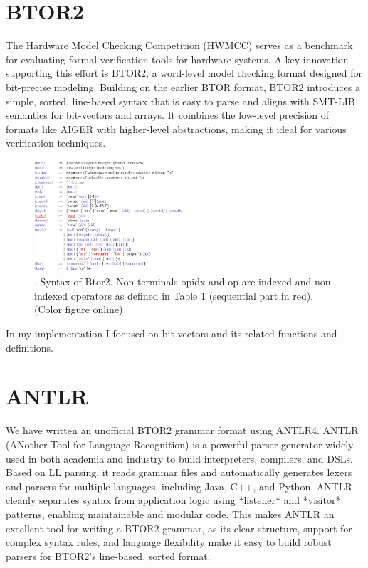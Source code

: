\section{BTOR2}
The Hardware Model Checking Competition (HWMCC) serves as a benchmark for evaluating formal verification tools for hardware systems. A key innovation supporting this effort is BTOR2, a word-level model checking format designed for bit-precise modeling. Building on the earlier BTOR format, BTOR2 introduces a simple, sorted, line-based syntax that is easy to parse and aligns with SMT-LIB semantics for bit-vectors and arrays. It combines the low-level precision of formats like AIGER with higher-level abstractions, making it ideal for various verification techniques. 
\begin{figure}[h]
  \centering
  \includegraphics[width=0.5\textwidth]{figures/btor2_syntax.png}
  \caption{. Syntax of Btor2. Non-terminals opidx and op are indexed and non-indexed operators as defined in Table 1 (sequential part in red). (Color figure online)}
\end{figure}
\cite{btor2}
In my implementation I focused on bit vectors and its related functions and definitions.

\section{ANTLR}
We have written an unofficial BTOR2 grammar format using ANTLR4.
ANTLR (ANother Tool for Language Recognition) is a powerful parser generator widely used in both academia and industry to build interpreters, compilers, and DSLs. Based on LL parsing, it reads grammar files and automatically generates lexers and parsers for multiple languages, including Java, C++, and Python. ANTLR cleanly separates syntax from application logic using *listener* and *visitor* patterns, enabling maintainable and modular code.
This makes ANTLR an excellent tool for writing a BTOR2 grammar, as its clear structure, support for complex syntax rules, and language flexibility make it easy to build robust parsers for BTOR2's line-based, sorted format.
\cite{antlr}

